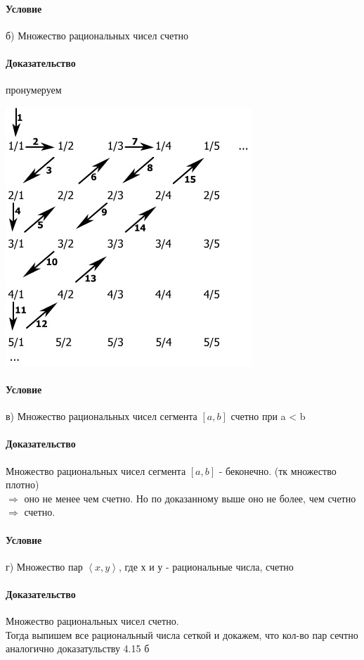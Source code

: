 \documentclass[a4paper,12pt]{article}
\begin{document}
\paragraph*{Условие}
б) Множество рациональных чисел счетно
\paragraph*{Доказательство}
пронумеруем\\
\begin{center}
  \includegraphics[scale=0.5]{image008.jpg}
\end{center}
\paragraph*{Условие}
в) Множество рациональных чисел сегмента $\left[ a, b\right] $ счетно при a < b
\paragraph*{Доказательство}
Множество рациональных чисел сегмента $\left[ a, b\right] $ - беконечно. (тк множество плотно)\\
$\Rightarrow$ оно не менее чем счетно. Но по доказанному выше оно не более, чем счетно $\Rightarrow$ счетно.
\paragraph*{Условие}
г) Множество пар $ \left\langle  x, y \right\rangle $, где х и у - рациональные числа, счетно
\paragraph*{Доказательство}
Множество рациональных чисел счетно.\\
Тогда выпишем все рациональный числа сеткой и докажем, что кол-во пар сечтно аналогично доказатульству 4.15 б\\
\end{document}
